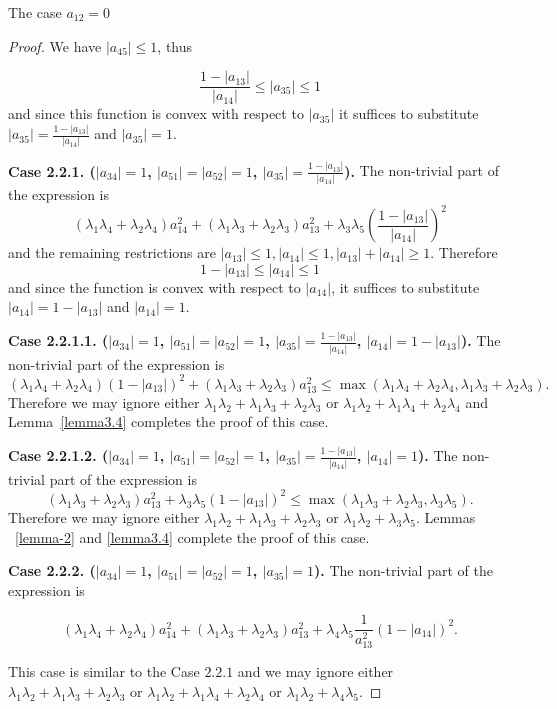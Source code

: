 \documentclass[12pt]{article}
\begin{document}
\begin{section}{The case \texorpdfstring{$a_{12} = 0$}{Lg}}
\begin{proof}
    We have $|a_{45}|\leq 1$, thus 

    $$
        \frac{1-|a_{13}|}{|a_{14}|}\leq |a_{35} | \leq 1
    $$
    and since this function is convex with respect to $|a_{35}|$ it suffices to substitute $|a_{35}| = \frac{1-|a_{13}|}{|a_{14}|}$ and $|a_{35}|=1$.

    \textbf{Case 2.2.1. ($|a_{34}|=1$, $|a_{51}|=|a_{52}|=1$, $|a_{35}| = \frac{1-|a_{13}|}{|a_{14}|}$).} The non-trivial part of the expression is 
     $$      (\lambda_{1}\lambda_{4} + \lambda_{2}\lambda_{4})a_{14}^2 + (\lambda_{1}\lambda_{3} + \lambda_{2}\lambda_{3})a_{13}^2 + \lambda_{3}\lambda_{5}\left(\frac{1-|a_{13}|}{|a_{14}|}\right)^2   $$
     and the remaining restrictions are $|a_{13}|\leq 1, |a_{14}|\leq 1, |a_{13}| + |a_{14}|\geq 1.$ Therefore $$ 1-|a_{13}|\leq |a_{14}| \leq 1$$
     and since the function is convex with respect to $|a_{14}|$, it suffices to substitute $|a_{14}| = 1 - |a_{13}|$ and $|a_{14}|=1$. 

     \textbf{Case 2.2.1.1. ($|a_{34}|=1$, $|a_{51}|=|a_{52}|=1$, $|a_{35}| = \frac{1-|a_{13}|}{|a_{14}|}$, $|a_{14}| = 1 - |a_{13}|$).} The non-trivial part of the expression is 
     $$      (\lambda_{1}\lambda_{4} + \lambda_{2}\lambda_{4})(1-|a_{13}|)^2 + (\lambda_{1}\lambda_{3} + \lambda_{2}\lambda_{3})a_{13}^2 \leq \max (\lambda_{1}\lambda_{4} + \lambda_{2}\lambda_{4}, \lambda_{1}\lambda_{3} + \lambda_{2}\lambda_{3}).   $$ 
     Therefore we may ignore  either $\lambda_{1}\lambda_{2} + \lambda_{1}\lambda_{3} + \lambda_{2}\lambda_{3}$ or $\lambda_{1}\lambda_{2} + \lambda_{1}\lambda_{4} + \lambda_{2}\lambda_{4}$ and Lemma~\ref{lemma3.4} completes the proof of this case. 

     \textbf{Case 2.2.1.2. ($|a_{34}|=1$, $|a_{51}|=|a_{52}|=1$, $|a_{35}| = \frac{1-|a_{13}|}{|a_{14}|}$, $|a_{14}| = 1$).} The non-trivial part of the expression is 
     $$       (\lambda_{1}\lambda_{3} + \lambda_{2}\lambda_{3})a_{13}^2 + \lambda_{3}\lambda_{5}(1-|a_{13}|)^2 \leq \max (\lambda_{1}\lambda_{3} + \lambda_{2}\lambda_{3}, \lambda_{3}\lambda_{5}).   $$
    Therefore we may ignore  either $\lambda_{1}\lambda_{2} + \lambda_{1}\lambda_{3} + \lambda_{2}\lambda_{3} $ or $\lambda_{1}\lambda_{2} + \lambda_{3}\lambda_{5}$. Lemmas ~\ref{lemma-2} and \ref{lemma3.4} complete the proof of this case.
    
    \textbf{Case 2.2.2. ($|a_{34}|=1$, $|a_{51}|=|a_{52}|=1$, $|a_{35}| = 1$).} The non-trivial part of the expression is 

    $$     
 (\lambda_{1}\lambda_{4} + \lambda_{2}\lambda_{4})a_{14}^2 + (\lambda_{1}\lambda_{3} + \lambda_{2}\lambda_{3})a_{13}^2  +\lambda_{4}\lambda_{5}\frac{1}{a_{13}^2}(1-|a_{14}|)^2.   $$

 This case is similar to the Case $2.2.1$ and we may ignore either $\lambda_{1}\lambda_{2} + \lambda_{1}\lambda_{3} + \lambda_{2}\lambda_{3}$ or  $\lambda_{1}\lambda_{2} + \lambda_{1}\lambda_{4} + \lambda_{2}\lambda_{4}$ or $\lambda_{1}\lambda_{2} + \lambda_{4}\lambda_{5}.$
    \end{proof}
    
\end{section}
\end{document}
